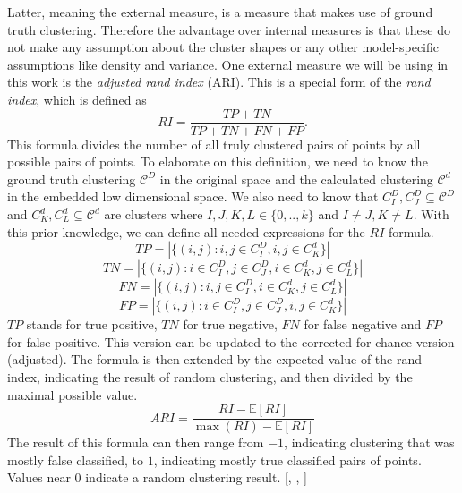 Latter, meaning the external measure, is a measure that makes use of ground truth clustering. Therefore the advantage over internal measures is that these do not make any assumption about the cluster shapes or any other model-specific assumptions like density and variance. One external measure we will be using in this work is the \textit{adjusted rand index} (ARI). This is a special form of the \textit{rand index}, which is defined as
\begin{equation}
    RI = \frac{TP+TN}{TP+TN+FN+FP}.
\end{equation}
This formula divides the number of all truly clustered pairs of points by all possible pairs of points. To elaborate on this definition, we need to know the ground truth clustering $\mathcal{C}^D$ in the original space and the calculated clustering $\mathcal{C}^d$ in the embedded low dimensional space. We also need to know that $C^D_I, C^D_J \subseteq \mathcal{C}^D$ and $C^d_K, C^d_L \subseteq \mathcal{C}^d$ are clusters where $I,J,K,L \in \{0,..,k\}$ and $I\neq J, K\neq L$. With this prior knowledge, we can define all needed expressions for the $RI$ formula.
\begin{equation}
    TP = |\{(i,j) : i,j \in C^D_I, i,j \in C^d_K \}|
\end{equation}
\begin{equation}
    TN = |\{(i,j) : i \in C^D_I, j \in C^D_J, i \in C^d_K, j \in C^d_L \}|
\end{equation}
\begin{equation}
    FN = |\{(i,j) : i,j \in C^D_I, i \in C^d_K, j \in C^d_L \}|
\end{equation}
\begin{equation}
    FP = |\{(i,j) : i \in C^D_I, j \in C^D_J, i,j \in C^d_K \}|
\end{equation}
$TP$ stands for true positive, $TN$ for true negative, $FN$ for false negative and $FP$ for false positive. This version can be updated to the corrected-for-chance version (adjusted). The formula is then extended by the expected value of the rand index, indicating the result of random clustering, and then divided by the maximal possible value.
\begin{equation}
    ARI=\frac{RI-\mathbb{E}[RI]}{\max(RI)-\mathbb{E}[RI]}
\end{equation}
The result of this formula can then range from $-1$, indicating clustering that was mostly false classified, to $1$, indicating mostly true classified pairs of points. Values near $0$ indicate a random clustering result. [\cite{rand_index}, \cite{sklearn_clu_eval}, \cite{wiki_rand_index}]

